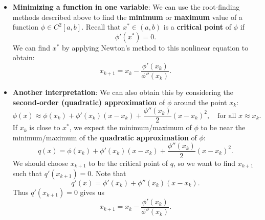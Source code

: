 \documentclass{report}
\begin{document}
\begin{itemize}
\item \textbf{Minimizing a function in one variable}:
    We can use the root-finding methods described above to find the \textbf{minimum} or \textbf{maximum} value of a function $\phi \in C^2[a,b]$.
    Recall that $x^* \in (a,b)$ is a \textbf{critical point} of $\phi$ if 
    $$\phi'(x^*) = 0.$$
    We can find $x^*$ by applying Newton's method to this nonlinear equation to obtain:
    $$x_{k+1} = x_k - \frac{\phi'(x_k)}{\phi''(x_k)}.$$
\item \textbf{Another interpretation}:
    We can also obtain this by considering the \textbf{second-order (quadratic) approximation} of $\phi$ around the point $x_k$:
    $$\phi(x) \approx \phi(x_k) + \phi'(x_k)(x-x_k) + \frac{\phi''(x_k)}{2}(x-x_k)^2, \quad \text{for all $x \approx x_k$}.$$
    If $x_k$ is close to $x^*$, we expect the minimum/maximum of $\phi$ to be near the minimum/maximum of the \textbf{quadratic approximation} of $\phi$:
    $$q(x) = \phi(x_k) + \phi'(x_k)(x-x_k) + \frac{\phi''(x_k)}{2}(x-x_k)^2.$$
    We should choose $x_{k+1}$ to be the critical point of $q$, so we want to find $x_{k+1}$ such that $q'(x_{k+1}) = 0$. Note that
    $$q'(x) = \phi'(x_k) + \phi''(x_k)(x-x_k).$$
    Thus $q'(x_{k+1}) = 0$ gives us
    $$x_{k+1} = x_k - \frac{\phi'(x_k)}{\phi''(x_k)}.$$










    \end{itemize}

    \pagebreak 
\end{document}
